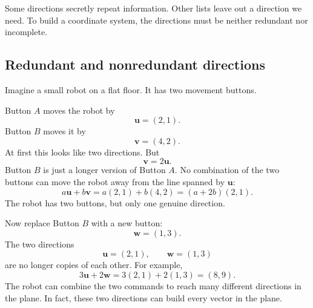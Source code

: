 Some directions secretly repeat information.  Other lists leave out a direction we need.
To build a coordinate system, the directions must be neither redundant nor incomplete.

\subsection{Redundant and nonredundant directions}

Imagine a small robot on a flat floor.  It has two movement buttons.

Button \(A\) moves the robot by
\[
    \mathbf u=(2,1).
\]
Button \(B\) moves it by
\[
    \mathbf v=(4,2).
\]
At first this looks like two directions.  But
\[
    \mathbf v=2\mathbf u.
\]
Button \(B\) is just a longer version of Button \(A\).  No combination of the two
buttons can move the robot away from the line spanned by \(\mathbf u\):
\[
    a\mathbf u+b\mathbf v
    =
    a(2,1)+b(4,2)
    =
    (a+2b)(2,1).
\]
The robot has two buttons, but only one genuine direction.

Now replace Button \(B\) with a new button:
\[
    \mathbf w=(1,3).
\]
The two directions
\[
    \mathbf u=(2,1),\qquad \mathbf w=(1,3)
\]
are no longer copies of each other.  For example,
\[
    3\mathbf u+2\mathbf w
    =
    3(2,1)+2(1,3)
    =
    (8,9).
\]
The robot can combine the two commands to reach many different directions in the
plane.  In fact, these two directions can build every vector in the plane.

